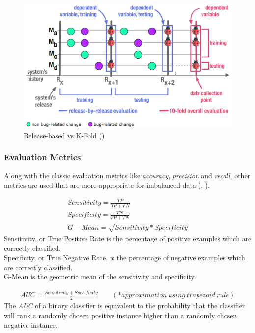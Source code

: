 \begin{figure}[H]
    \centering
    \includegraphics[scale=0.3]{./src/release_based_testing.png}
    \caption{Release-based vs K-Fold (\cite{performance_method_bug})}
    \label{kfold_vs_release}
\end{figure}

\subsubsection{Evaluation Metrics}

Along with the classic evaluation metrics like \textit{accuracy}, \textit{precision} and \textit{recall}, other metrics are used that are more appropriate for imbalanced data (\cite{comparison_metrics}, \cite{iba_metric}). 


\begin{gather*}
Sensitivity = \frac{TP}{TP + FN}\\
Specificity = \frac{TN}{FP + TN}\\
G-Mean = \sqrt{Sensitivity * Specificity}
\end{gather*} 
Sensitivity, or True Positive Rate is the percentage of positive examples which
are correctly classified.\\
Specificity, or True Negative Rate, is the percentage of negative examples which are correctly classified.\\
G-Mean is the geometric mean of the sensitivity and specificity.


\begin{gather*}
AUC = \frac{Sensitivity + Specificity}{2} \qquad (*approximation \ using \ trapezoid \ rule)
\end{gather*} 
The \textit{AUC} of a binary classifier is equivalent to the probability that the classifier will rank a randomly chosen positive instance higher than a randomly chosen negative instance.


